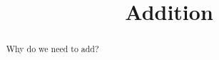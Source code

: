 \documentclass{ximera}
\title{Addition}
\begin{document}
\begin{abstract}
Why do we need to add?
\end{abstract}
\maketitle
\end{document}

